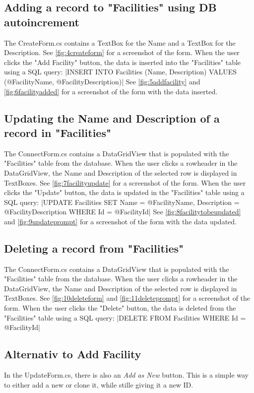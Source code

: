 \subsection{Adding a record to "Facilities" using DB autoincrement}
The CreateForm.cs contains a TextBox for the Name and a TextBox for the Description. See \ref*{fig:4createform} for a screenshot of the form.
When the user clicks the "Add Facility" button, the data is inserted into the "Facilities" table using a SQL query:
|INSERT INTO Facilities (Name, Description) VALUES (@FacilityName, @FacilityDescription)|
See \ref*{fig:5addfacility} and \ref*{fig:6facilityadded} for a screenshot of the form with the data inserted.

\subsection{Updating the Name and Description of a record in "Facilities"}
The ConnectForm.cs contains a DataGridView that is populated with the "Facilities" table from the database. 
When the user clicks a rowheader in the DataGridView, the Name and Description of the selected row is displayed in TextBoxes.
See \ref*{fig:7facilityupdate} for a screenshot of the form. When the user clicks the "Update" button, the data is updated in the "Facilities" table using a SQL query:
|UPDATE Facilities SET Name = @FacilityName, Description = @FacilityDescription WHERE Id = @FacilityId|
See \ref*{fig:8facilitytobeupdated} and \ref*{fig:9updateprompt} for a screenshot of the form with the data updated.

\subsection{Deleting a record from "Facilities"}
The ConnectForm.cs contains a DataGridView that is populated with the "Facilities" table from the database. 
When the user clicks a rowheader in the DataGridView, the Name and Description of the selected row is displayed in TextBoxes.
See \ref*{fig:10deleteform} and \ref*{fig:11deleteprompt} for a screenshot of the form. 
When the user clicks the "Delete" button, the data is deleted from the "Facilities" table using a SQL query:
|DELETE FROM Facilities WHERE Id = @FacilityId|

\subsection{Alternativ to Add Facility}
In the UpdateForm.cs, there is also an \emph{Add as New} button. This is a simple way to either add a new or clone it, while stille giving it a new ID.